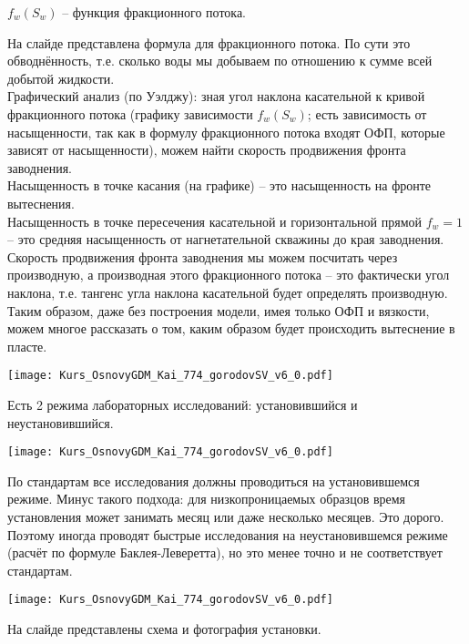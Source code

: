 \documentclass[main.tex]{subfiles}
\begin{document}
$f_w(S_w)$ -- функция фракционного потока.

На слайде представлена формула для фракционного потока.
По сути это обводнённость, т.е. сколько воды мы добываем по отношению к сумме всей добытой жидкости.
\\

Графический анализ (по Уэлджу): зная угол наклона касательной к кривой фракционного потока (графику зависимости $f_w(S_w)$; есть зависимость от насыщенности, так как в формулу фракционного потока входят ОФП, которые зависят от насыщенности), можем найти скорость продвижения фронта заводнения.
\\

Насыщенность в точке касания (на графике) -- это насыщенность на фронте вытеснения.
\\

Насыщенность в точке пересечения касательной и горизонтальной прямой $f_w=1$ -- это средняя насыщенность от нагнетательной скважины до края заводнения.
\\

Скорость продвижения фронта заводнения мы можем посчитать через производную, а производная этого фракционного потока -- это фактически угол наклона, т.е. тангенс угла наклона касательной будет определять производную.
\\

Таким образом, даже без построения модели, имея только ОФП и вязкости, можем многое рассказать о том, каким образом будет происходить вытеснение в пласте.

\texttt{[image: Kurs\_OsnovyGDM\_Kai\_774\_gorodovSV\_v6\_0.pdf]}

Есть 2 режима лабораторных исследований: установившийся и неустановившийся.

\texttt{[image: Kurs\_OsnovyGDM\_Kai\_774\_gorodovSV\_v6\_0.pdf]}

По стандартам все исследования должны проводиться на установившемся режиме.
Минус такого подхода: для низкопроницаемых образцов время установления может занимать месяц или даже несколько месяцев.
Это дорого.
Поэтому иногда проводят быстрые исследования на неустановившемся режиме (расчёт по формуле Баклея-Леверетта), но это менее точно и не соответствует стандартам.

\texttt{[image: Kurs\_OsnovyGDM\_Kai\_774\_gorodovSV\_v6\_0.pdf]}

На слайде представлены схема и фотография установки.
\end{document}
